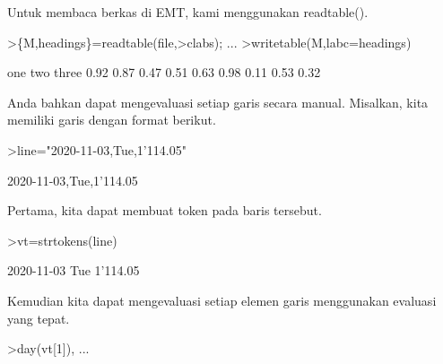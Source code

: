 \documentclass[a4paper,10pt]{article}
\begin{document}
\begin{eulernotebook}
\begin{eulercomment}
\begin{eulercomment}
\begin{eulercomment}
\begin{eulercomment}
\begin{eulercomment}
\begin{eulercomment}
\begin{eulercomment}
\begin{eulercomment}
\begin{eulercomment}
\begin{eulercomment}
\begin{eulercomment}
\begin{eulercomment}
\begin{eulercomment}
\begin{eulercomment}
\begin{eulercomment}
\begin{eulercomment}
\begin{eulercomment}
\begin{eulercomment}
\begin{eulercomment}
\begin{eulercomment}
\begin{eulercomment}
\begin{eulercomment}
\begin{eulercomment}
\begin{eulercomment}
\begin{eulercomment}
\begin{eulercomment}
\begin{eulercomment}
\begin{eulercomment}
\begin{eulercomment}
\begin{eulercomment}
\begin{eulercomment}
\begin{eulercomment}
\begin{eulercomment}
\begin{eulercomment}
\begin{eulercomment}
\begin{eulercomment}
\begin{eulercomment}
Untuk membaca berkas di EMT, kami menggunakan readtable().
\end{eulercomment}
\begin{eulerprompt}
>\{M,headings\}=readtable(file,>clabs); ...
>writetable(M,labc=headings)
\end{eulerprompt}
\begin{euleroutput}
         one       two     three
        0.92      0.87      0.47
        0.51      0.63      0.98
        0.11      0.53      0.32
\end{euleroutput}
\begin{eulercomment}
Anda bahkan dapat mengevaluasi setiap garis secara manual. Misalkan,
kita memiliki garis dengan format berikut.
\end{eulercomment}
\begin{eulerprompt}
>line="2020-11-03,Tue,1'114.05"
\end{eulerprompt}
\begin{euleroutput}
  2020-11-03,Tue,1'114.05
\end{euleroutput}
\begin{eulercomment}
Pertama, kita dapat membuat token pada baris tersebut.
\end{eulercomment}
\begin{eulerprompt}
>vt=strtokens(line)
\end{eulerprompt}
\begin{euleroutput}
  2020-11-03
  Tue
  1'114.05
\end{euleroutput}
\begin{eulercomment}
Kemudian kita dapat mengevaluasi setiap elemen garis menggunakan
evaluasi yang tepat.
\end{eulercomment}
\begin{eulerprompt}
>day(vt[1]),  ...

\end{eulerprompt}
\end{eulercomment}
\end{eulercomment}
\end{eulercomment}
\end{eulercomment}
\end{eulercomment}
\end{eulercomment}
\end{eulercomment}
\end{eulercomment}
\end{eulercomment}
\end{eulercomment}
\end{eulercomment}
\end{eulercomment}
\end{eulercomment}
\end{eulercomment}
\end{eulercomment}
\end{eulercomment}
\end{eulercomment}
\end{eulercomment}
\end{eulercomment}
\end{eulercomment}
\end{eulercomment}
\end{eulercomment}
\end{eulercomment}
\end{eulercomment}
\end{eulercomment}
\end{eulercomment}
\end{eulercomment}
\end{eulercomment}
\end{eulercomment}
\end{eulercomment}
\end{eulercomment}
\end{eulercomment}
\end{eulercomment}
\end{eulercomment}
\end{eulercomment}
\end{eulercomment}
\end{eulernotebook}
\end{document}
